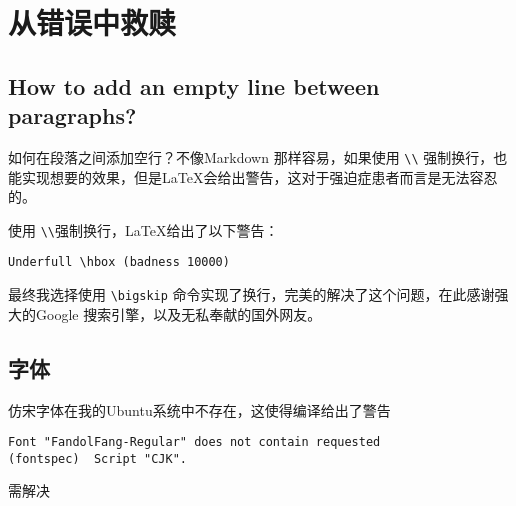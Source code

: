 \chapter{从错误中救赎}

\section[换行]{How to add an empty line between paragraphs?}

如何在段落之间添加空行？不像Markdown 那样容易，如果使用 \verb`\\` 强制换行，也能实现想要的效果，但是\LaTeX 会给出警告，这对于强迫症患者而言是无法容忍的。

使用 \verb`\\`强制换行，\LaTeX 给出了以下警告：
\begin{lstlisting}
Underfull \hbox (badness 10000)
\end{lstlisting}

最终我选择使用 \verb|\bigskip|  命令实现了换行，完美的解决了这个问题，在此感谢强大的Google 搜索引擎，以及无私奉献的国外网友。
\section{字体}

仿宋字体在我的Ubuntu系统中不存在，这使得编译给出了警告
\begin{lstlisting}
Font "FandolFang-Regular" does not contain requested
(fontspec)	Script "CJK".
\end{lstlisting}
需解决
